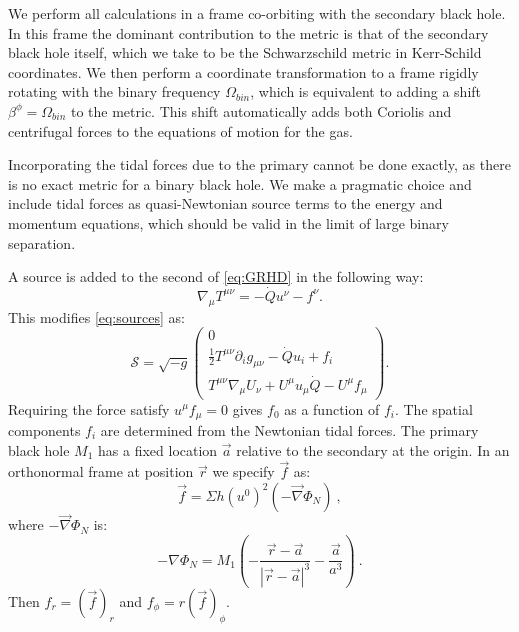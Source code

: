 \documentclass{emulateapj}
\newcommand{\be}{\beta}
\newcommand{\Sig}{\Sigma}
\newcommand{\Om}{\Omega}
\newcommand{\pd}{\partial}
\begin{document}
We perform all calculations in a frame co-orbiting with the secondary black hole.  In this frame the dominant contribution to the metric is that of the secondary black hole itself, which we take to be the Schwarzschild metric in Kerr-Schild coordinates.  We then perform a coordinate transformation to a frame rigidly rotating with the binary frequency $\Om_{bin}$, which is equivalent to adding a shift $\be^\phi = \Om_{bin}$ to the metric.  This shift automatically adds both Coriolis and centrifugal forces to the equations of motion for the gas.

Incorporating the tidal forces due to the primary cannot be done exactly, as there is no exact metric for a binary black hole.  We make a pragmatic choice and include tidal forces as quasi-Newtonian source terms to the energy and momentum equations, which should be valid in the limit of large binary separation.

A source is added to the second of \eqref{eq:GRHD} in the following way:
\begin{equation}
	\nabla_\mu T^{\mu\nu} = -\dot{Q} u^\nu - f^\nu . 
\end{equation}
This modifies \eqref{eq:sources} as:
\begin{equation}
	\mathcal{S} = \sqrt{-g} \begin{pmatrix} 0 \\
                        \frac{1}{2}T^{\mu\nu}\pd_i g_{\mu\nu} - \dot{Q}u_i  + f_i \\
                        T^{\mu\nu}\nabla_\mu U_\nu + U^\mu u_\mu \dot{Q} - U^\mu f_\mu \end{pmatrix} .\label{eq:sources}
\end{equation}
Requiring the force satisfy $u^\mu f_\mu = 0$ gives $f_0$ as a function of $f_i$.  The spatial components $f_i$ are determined from the Newtonian tidal forces.  The primary black hole $M_1$ has a fixed location $\vec{a}$ relative to the secondary at the origin.  In an orthonormal frame at position $\vec{r}$ we specify $\vec{f}$ as:
\begin{equation}
	\vec{f} = \Sig h (u^0)^2 \left( -\vec{\nabla} \Phi_N \right) \ ,
\end{equation}
where $-\vec{\nabla} \Phi_N$ is:
\begin{equation}
	-\nabla \Phi_{N} = M_1 \left( -\frac{\vec{r} - \vec{a}}{|\vec{r}-\vec{a}|^3} - \frac{\vec{a}}{a^3}\right)\ .
\end{equation}
Then $f_r = (\vec{f})_r$ and $f_\phi = r(\vec{f})_\phi$.
\end{document}
